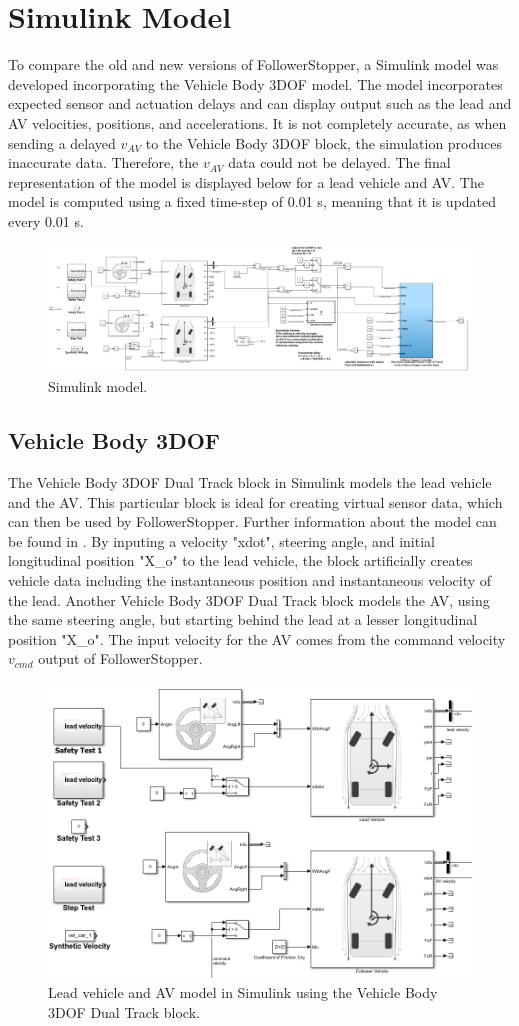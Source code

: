 \documentclass[conference]{IEEEtran}
\begin{document}
\section{Simulink Model}
To compare the old and new versions of FollowerStopper, a Simulink model was developed incorporating the Vehicle Body 3DOF model. The model incorporates expected sensor and actuation delays and can display output such as the lead and AV velocities, positions, and accelerations. It is not completely accurate, as when sending a delayed $v_{AV}$ to the Vehicle Body 3DOF block, the simulation produces inaccurate data. Therefore, the $v_{AV}$ data could not be delayed. The final representation of the model is displayed below for a lead vehicle and AV. The model is computed using a fixed time-step of 0.01 s, meaning that it is updated every 0.01 s.

\begin{figure}[htbp]
\centerline{\includegraphics[width=3.5 in]{simulink_model.PNG}}
\caption{Simulink model.}
\label{fig2}
\end{figure}

\subsection{Vehicle Body 3DOF}
The Vehicle Body 3DOF Dual Track block in Simulink models the lead vehicle and the AV. This particular block is ideal for creating virtual sensor data, which can then be used by FollowerStopper. Further information about the model can be found in \cite{vehicledynamicsblockset}. By inputing a velocity "xdot", steering angle, and initial longitudinal position "X\_o" to the lead vehicle, the block artificially creates vehicle data including the instantaneous position and instantaneous velocity of the lead. Another Vehicle Body 3DOF Dual Track block models the AV, using the same steering angle, but starting behind the lead at a lesser longitudinal position "X\_o". The input velocity for the AV comes from the command velocity $v_{cmd}$ output of FollowerStopper.

\begin{figure}[htbp]
\centerline{\includegraphics[width=3.5 in]{vehicle_body_3dof.PNG}}
\caption{Lead vehicle and AV model in Simulink using the Vehicle Body 3DOF Dual Track block.}
\label{fig2}
\end{figure}
\end{document}
